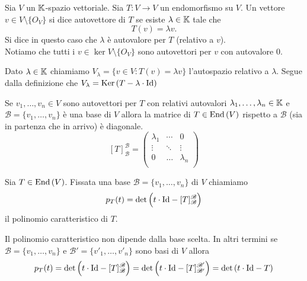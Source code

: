 
\begin{definition}
	Sia $ V $ un $ \mathbb{K} $-spazio vettoriale. Sia $ T \colon V \to V $ un endomorfismo su $ V $. Un vettore $ v \in V \setminus \{O_V\} $ si dice autovettore di $ T $ se esiste $ \lambda \in \mathbb{K} $ tale che \[T(v) = \lambda v.\] Si dice in questo caso che $ \lambda $ è autovalore per $ T $ (relativo a $ v $). \\
	Notiamo che tutti i $ v \in \ker{V} \setminus \{O_V\} $ sono autovettori per $ v $ con autovalore 0.  
\end{definition}

\begin{definition}[autospazio]
	Dato $ \lambda \in \mathbb{K} $ chiamiamo $ V_\lambda = \{v \in V : T(v) = \lambda v\} $ l'autospazio relativo a $ \lambda $. Segue dalla definizione che $ V_\lambda = \operatorname{Ker}{\left(T - \lambda \cdot \mathrm{Id}\right) }$
\end{definition}

\begin{prop}
	Se $ v_1, \ldots, v_n \in V $ sono autovettori per $ T $ con relativi autovalori $ \lambda_1, \ldots, \lambda_n \in \mathbb{K} $ e $ \mathscr{B} = \{v_1, \ldots, v_n\} $ è una base di $ V $ allora la matrice di $ T \in \operatorname{End}{(V)} $ rispetto a $ \mathscr{B} $ (sia in partenza che in arrivo) è diagonale. 
	\[[T]_{\mathscr{B}}^{\mathscr{B}} = 
	\begin{pmatrix}
	\lambda_1 & \cdots & 0 \\
	\vdots & \ddots & \vdots \\
	0 & \ldots & \lambda_n \\
	\end{pmatrix}\]
\end{prop}

\begin{definition}
	Sia $ T \in \operatorname{End}{(V)} $. Fissata una base $ \mathscr{B} = \{v_1, \ldots, v_n\} $ di $ V $ chiamiamo \[p_T(t) = \det \left(t \cdot \mathrm{Id} - [T]_{\mathscr{B}}^{\mathscr{B}}\right)\] il polinomio caratteristico di $ T $. 
\end{definition}

\begin{prop}
	Il polinomio caratteristico non dipende dalla base scelta. In altri termini se $ \mathscr{B} = \{v_1, \ldots, v_n\} $ e $ \mathscr{B}' = \{v'_1, \ldots, v'_n\} $ sono basi di $ V $ allora \[p_T(t) = \det \left(t \cdot \mathrm{Id} - [T]_{\mathscr{B}}^{\mathscr{B}}\right) = \det \left(t \cdot \mathrm{Id} - [T]_{\mathscr{B}'}^{\mathscr{B}'}\right) = \det \left(t \cdot \mathrm{Id} - T\right)\]
\end{prop}

